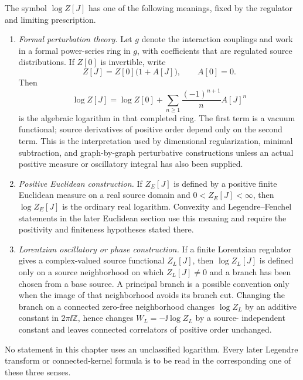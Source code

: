 \begin{definition}
\label{def:source-functional-log-status}
The symbol \(\log Z[J]\) has one of the following meanings, fixed by the
regulator and limiting prescription.
\begin{enumerate}
  \item \emph{Formal perturbation theory.}  Let \(g\) denote the interaction
  couplings and work in a formal power-series ring in \(g\), with coefficients
  that are regulated source distributions.  If \(Z[0]\) is invertible, write
  \[
    Z[J]=Z[0]\bigl(1+A[J]\bigr),
    \qquad
    A[0]=0 .
  \]
  Then
  \[
    \log Z[J]
    =
    \log Z[0]
    +
    \sum_{n\geq1}\frac{(-1)^{n+1}}{n}A[J]^n
  \]
  is the algebraic logarithm in that completed ring.  The first term is a
  vacuum functional; source derivatives of positive order depend only on the
  second term.  This is the interpretation used by dimensional
  regularization, minimal subtraction, and graph-by-graph perturbative
  constructions unless an actual positive measure or oscillatory integral has
  also been supplied.

  \item \emph{Positive Euclidean construction.}  If \(Z_E[J]\) is defined by a
  positive finite Euclidean measure on a real source domain and
  \(0<Z_E[J]<\infty\), then \(\log Z_E[J]\) is the ordinary real logarithm.
  Convexity and Legendre--Fenchel statements in the later Euclidean section
  use this meaning and require the positivity and finiteness hypotheses stated
  there.

  \item \emph{Lorentzian oscillatory or phase construction.}  If a finite
  Lorentzian regulator gives a complex-valued source functional \(Z_L[J]\),
  then \(\log Z_L[J]\) is defined only on a source neighborhood on which
  \(Z_L[J]\neq0\) and a branch has been chosen from a base source.  A principal
  branch is a possible convention only when the image of that neighborhood
  avoids its branch cut.  Changing the branch on a connected zero-free
  neighborhood changes \(\log Z_L\) by an additive constant in
  \(2\pi\ii\mathbb Z\), hence changes \(W_L=-\ii\log Z_L\) by a source-
  independent constant and leaves connected correlators of positive order
  unchanged.
\end{enumerate}
No statement in this chapter uses an unclassified logarithm.  Every later
Legendre transform or connected-kernel formula is to be read in the
corresponding one of these three senses.
\end{definition}

